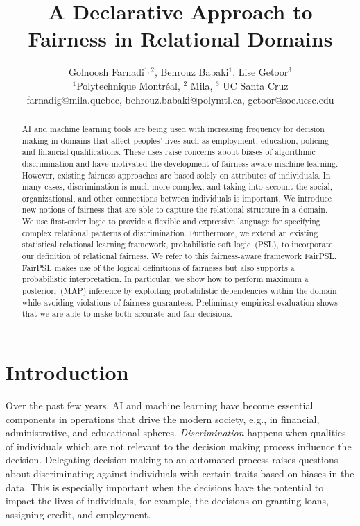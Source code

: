 \documentclass[11pt]{article}
\begin{document}
\title{A Declarative Approach to Fairness in Relational Domains}
\author{Golnoosh Farnadi$^{1,2}$, Behrouz Babaki$^1$, Lise Getoor$^3$\\
$^1$Polytechnique Montr\'{e}al, $^2$ Mila, $^3$ UC Santa Cruz \\
farnadig@mila.quebec, behrouz.babaki@polymtl.ca, getoor@soe.ucsc.edu}

\maketitle

\begin{abstract}
AI and machine learning tools are being used with increasing frequency for decision making in domains that affect peoples' lives such as employment, education, policing and %
financial qualifications. These uses raise concerns about biases of algorithmic discrimination and have motivated the development of fairness-aware machine learning. However, existing fairness approaches are based solely on attributes of individuals. In many cases, discrimination is much more complex, and taking into account the social, organizational, and other connections between individuals is important. We introduce new notions of fairness that are able to capture the relational structure in a domain. We use first-order logic to provide a flexible and expressive language for specifying complex relational patterns of discrimination. Furthermore, we extend an existing statistical relational learning framework, probabilistic soft logic~(PSL), to incorporate our definition of relational fairness. We refer to this fairness-aware framework FairPSL. FairPSL makes use of the logical definitions of fairnesss but also supports a probabilistic interpretation. In particular, we show how to perform maximum a posteriori~(MAP) inference by exploiting probabilistic dependencies within the domain while avoiding violations of fairness guarantees. Preliminary empirical evaluation shows that we are able to make both accurate and fair decisions.
\end{abstract}

\section{Introduction}
\label{sec:introduction}

Over the past few years, AI and machine learning have become essential components in operations that drive the modern society, e.g., in financial, administrative, and educational spheres. \emph{Discrimination} happens when qualities of individuals which are not relevant to the decision making process influence the decision. Delegating decision making to an automated process raises questions about discriminating against individuals with certain traits based on biases in the data. This is especially important when the decisions have the potential to impact the lives of individuals, for example, the decisions on granting loans, assigning credit, and employment. 
\end{document}
